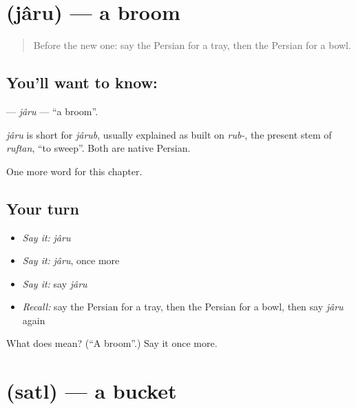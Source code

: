 \section[\texorpdfstring{\fa{جارو} (jâru)}{جارو (jâru)}]{ (jâru) — a broom}

\label{lesson:FA-C111-jaru}



\begin{quote}
Before the new one: say the Persian for a tray, then the Persian for a bowl.
\end{quote}

\subsection*{You'll want to know: }
\textbf{} — \emph{jâru} — \textquotedblleft{}a broom\textquotedblright{}.

\begin{cousinweb}
\emph{jâru} is short for \emph{jârub}, usually explained as built on \emph{rub-}, the present stem of \emph{ruftan}, \textquotedblleft{}to sweep\textquotedblright{}. Both are native Persian.
\end{cousinweb}

\begin{grammarlens}[title={What you've built}]
One more word for this chapter.
\end{grammarlens}

\subsection*{Your turn}
\begin{itemize}
\raggedright
  \item \emph{Say it:} \emph{jâru}
  \item \emph{Say it:} \emph{jâru}, once more
  \item \emph{Say it:} say \emph{jâru}
  \item \emph{Recall:} say the Persian for a tray, then the Persian for a bowl, then say \emph{jâru} again
\end{itemize}

\begin{tcolorbox}[breakable,colback=teal!4,colframe=teal!35!black,title={Before you move on}]
What does  mean? (\textquotedblleft{}A broom\textquotedblright{}.) Say it once more.
\end{tcolorbox}
\section[\texorpdfstring{\fa{سطل} (satl)}{سطل (satl)}]{ (satl) — a bucket}

